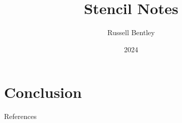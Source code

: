 \documentclass{beamer}
\title{Stencil Notes}
\author{Russell Bentley}
\institute{Stony Brook}
\date{2024}
\begin{document}
\frame{\titlepage}





\section{Conclusion}
\begin{frame}[allowframebreaks]{References}
    \tiny
    \printbibliography
\end{frame}
\end{document}

